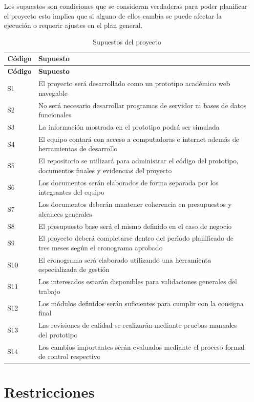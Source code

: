 \documentclass[11pt,spanish]{article}
\begin{document}
Los supuestos son condiciones que se consideran verdaderas para poder planificar el proyecto esto implica que si alguno de ellos cambia se puede afectar la ejecución o requerir ajustes en el plan general.

\begin{longtable}{L{2cm} L{12.4cm}}
\caption{Supuestos del proyecto}\label{tab:supuestos}\\[-0.5em]
\toprule
\textbf{Código} & \textbf{Supuesto} \\
\midrule
\endfirsthead
\toprule
\textbf{Código} & \textbf{Supuesto} \\
\midrule
\endhead
S1 & El proyecto será desarrollado como un prototipo académico web navegable \\
S2 & No será necesario desarrollar programas de servidor ni bases de datos funcionales \\
S3 & La información mostrada en el prototipo podrá ser simulada \\
S4 & El equipo contará con acceso a computadoras e internet además de herramientas de desarrollo \\
S5 & El repositorio se utilizará para administrar el código del prototipo, documentos finales y evidencias del proyecto \\
S6 & Los documentos serán elaborados de forma separada por los integrantes del equipo \\
S7 & Los documentos deberán mantener coherencia en presupuestos y alcances generales \\
S8 & El presupuesto base será el mismo definido en el caso de negocio \\
S9 & El proyecto deberá completarse dentro del periodo planificado de tres meses según el cronograma aprobado \\
S10 & El cronograma será elaborado utilizando una herramienta especializada de gestión \\
S11 & Los interesados estarán disponibles para validaciones generales del trabajo \\
S12 & Los módulos definidos serán suficientes para cumplir con la consigna final \\
S13 & Las revisiones de calidad se realizarán mediante pruebas manuales del prototipo \\
S14 & Los cambios importantes serán evaluados mediante el proceso formal de control respectivo \\
\bottomrule
\end{longtable}

\section{Restricciones}
\end{document}
